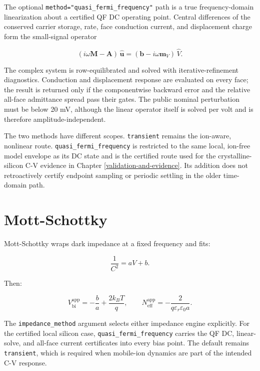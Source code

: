 \documentclass[
  11pt,
  american,
]{report}
\begin{document}
The optional \texttt{method="quasi\_fermi\_frequency"} path is a true
frequency-domain linearization about a certified QF DC operating point.
Central differences of the conserved carrier storage, rate, face
conduction current, and displacement charge form the small-signal
operator

\begin{equation}
\label{eq:qf-small-signal}
(i\omega\mathbf{M}-\mathbf{A})\,\hat{\mathbf{u}}
=(\mathbf{b}-i\omega\mathbf{m}_V)\,\hat V.
\end{equation}

The complex system is row-equilibrated and solved with
iterative-refinement diagnostics. Conduction and displacement response
are evaluated on every face; the result is returned only if the
componentwise backward error and the relative all-face admittance spread
pass their gates. The public nominal perturbation must be below 20 mV,
although the linear operator itself is solved per volt and is therefore
amplitude-independent.

The two methods have different scopes. \texttt{transient} remains the
ion-aware, nonlinear route. \texttt{quasi\_fermi\_frequency} is
restricted to the same local, ion-free model envelope as its DC state
and is the certified route used for the crystalline-silicon C-V evidence
in Chapter \ref{validation-and-evidence}. Its addition does not
retroactively certify endpoint sampling or periodic settling in the
older time-domain path.

\hypertarget{mott-schottky}{%
\section{Mott-Schottky}\label{mott-schottky}}

Mott-Schottky wraps dark impedance at a fixed frequency and fits:

\[
\frac{1}{C^2}=aV+b.
\]

Then:

\[
V_\mathrm{bi}^\mathrm{app}=-\frac{b}{a}+\frac{2k_BT}{q},
\qquad
N_\mathrm{eff}^\mathrm{app}
=
-\frac{2}{q\varepsilon_r\varepsilon_0 a}.
\]

The \texttt{impedance\_method} argument selects either impedance engine
explicitly. For the certified local silicon case,
\texttt{quasi\_fermi\_frequency} carries the QF DC, linear-solve, and
all-face current certificates into every bias point. The default remains
\texttt{transient}, which is required when mobile-ion dynamics are part
of the intended C-V response.
\end{document}
